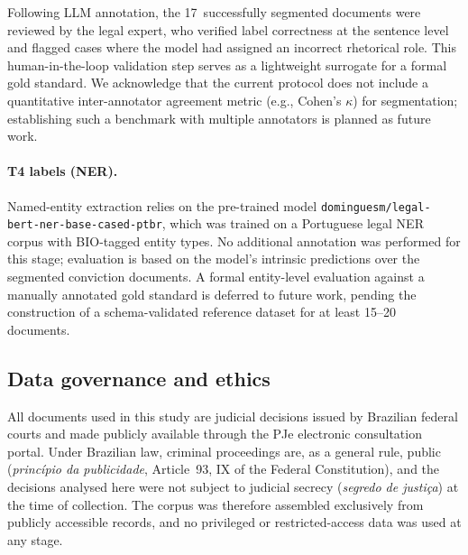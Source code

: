 \documentclass[preprint,a4paper,fleqn]{cas-dc}
\begin{document}
Following LLM annotation, the 17~successfully segmented documents were reviewed by the legal expert, who verified label correctness at the sentence level and flagged cases where the model had assigned an incorrect rhetorical role. This human-in-the-loop validation step serves as a lightweight surrogate for a formal gold standard. We acknowledge that the current protocol does not include a quantitative inter-annotator agreement metric (e.g., Cohen's $\kappa$) for segmentation; establishing such a benchmark with multiple annotators is planned as future work.

\paragraph{T4 labels (NER).}
Named-entity extraction relies on the pre-trained model \texttt{dominguesm/legal-bert-ner-base-cased-ptbr}, which was trained on a Portuguese legal NER corpus with BIO-tagged entity types. No additional annotation was performed for this stage; evaluation is based on the model's intrinsic predictions over the segmented conviction documents. A formal entity-level evaluation against a manually annotated gold standard is deferred to future work, pending the construction of a schema-validated reference dataset for at least 15--20 documents.
\subsection{Data governance and ethics}
\label{subsec:ethics}

All documents used in this study are judicial decisions issued by Brazilian federal courts and made publicly available through the PJe electronic consultation portal. Under Brazilian law, criminal proceedings are, as a general rule, public (\textit{princ\'ipio da publicidade}, Article~93, IX of the Federal Constitution), and the decisions analysed here were not subject to judicial secrecy (\textit{segredo de justi\c{c}a}) at the time of collection. The corpus was therefore assembled exclusively from publicly accessible records, and no privileged or restricted-access data was used at any stage.
\end{document}
